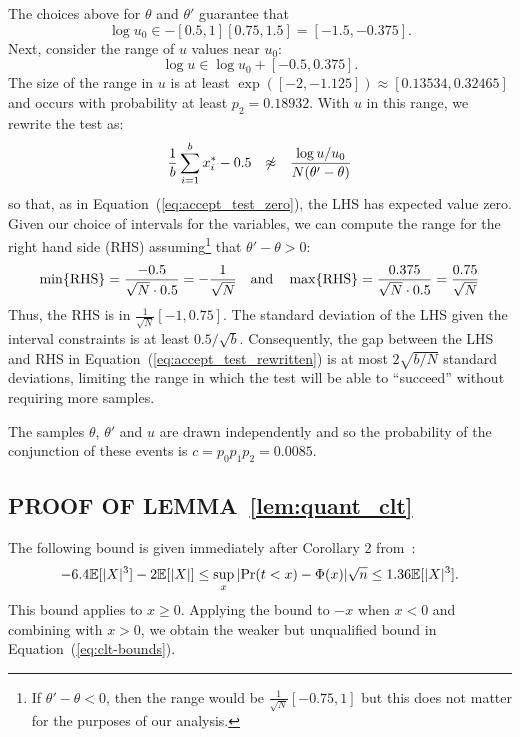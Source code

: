 \documentclass[letterpaper]{article}
\newcommand{\mE}{\mathbb{E}}
\begin{document}
The choices above for $\theta$ and $\theta'$ guarantee that
\begin{equation}\label{eq:log_uo_range}
    \log u_0 \in -[0.5,1][0.75,1.5] = [-1.5, -0.375].
\end{equation}
Next, consider the range of $u$ values near $u_0$:
\begin{equation}\label{eq:log_u_range}
    \log u \in \log u_0 + [-0.5,0.375].
\end{equation}
The size of the range in $u$ is at least $\exp([-2,-1.125]) \approx
[0.13534,0.32465]$ and occurs with probability at least $p_2=0.18932$. With $u$
in this range, we rewrite the test as:
\begin{equation}\label{eq:accept_test_rewritten}
    \frac{1}{b}\sum_{i=1}^b x_i^*-0.5 \hspace{0.1in} \not\approx \hspace{0.1in} \frac{\log u/u_0}{N(\theta'-\theta)}
\end{equation}
so that, as in Equation~(\ref{eq:accept_test_zero}), the LHS has expected value
zero.  Given our choice of intervals for the variables, we can compute the range
for the right hand side (RHS) assuming\footnote{If $\theta'-\theta<0$, then the
range would be $\frac{1}{\sqrt{N}}[-0.75,1]$ but this does not matter for
the purposes of our analysis.} that $\theta'-\theta > 0$:
\begin{equation}\label{eq:rhs_range}
\min\{{\rm RHS}\} = \frac{-0.5}{\sqrt{N} \cdot 0.5} = -\frac{1}{\sqrt{N}}
\quad {\rm and} \quad \max\{{\rm RHS}\} = \frac{0.375}{\sqrt{N} \cdot 0.5} = \frac{0.75}{\sqrt{N}}
\end{equation}
Thus, the RHS is in $\frac{1}{\sqrt{N}}[-1,0.75]$.  The standard deviation of
the LHS given the interval constraints is at least $0.5/\sqrt{b}$.
Consequently, the gap between the LHS and RHS in
Equation~(\ref{eq:accept_test_rewritten}) is at most $2\sqrt{b/N}$ standard
deviations, limiting the range in which the test will be able to ``succeed''
without requiring more samples.

The samples $\theta$, $\theta'$ and $u$ are drawn independently and so the
probability of the conjunction of these events is $c = p_0 p_1 p_2 = 0.0085$.


\subsection{PROOF OF LEMMA~\ref{lem:quant_clt}}\label{app:quant_clt}

The following bound is given immediately after Corollary 2 from~\citep{explicit-clt05}:
\begin{equation}
-6.4\mE[|X|^3]-2\mE[|X|] \leq \sup_x|{\rm Pr}(t<x)-\Phi(x)|{\sqrt{n}} \leq
1.36\mE[|X|^3].
\end{equation}
This bound applies to $x\geq 0$. Applying the bound to $-x$ when $x<0$
and combining with $x>0$, we obtain the weaker but unqualified bound
in Equation~(\ref{eq:clt-bounds}).
\end{document}
